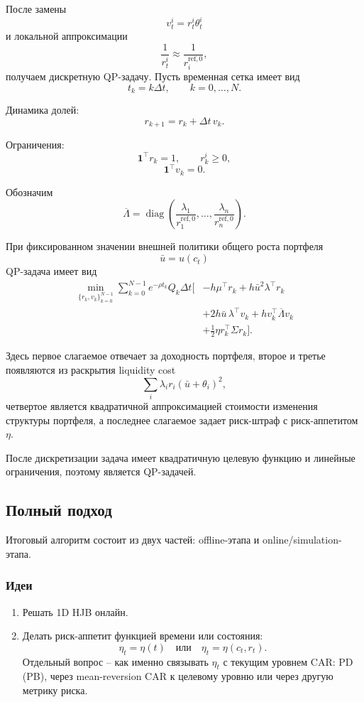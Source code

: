 \documentclass[12pt,a4paper]{article}
\begin{document}
После замены
\[
    v_t^i = r_t^i\theta_t^i
\]
и локальной аппроксимации
\[
    \frac{1}{r_t^i} \approx \frac{1}{r_i^{\mathrm{ref},0}},
\]
получаем дискретную QP-задачу. Пусть временная сетка имеет вид
\[
    t_k = k\Delta t,\qquad k=0,\dots,N.
\]

Динамика долей:
\[
    r_{k+1} = r_k + \Delta t\, v_k.
\]

Ограничения:
\[
    \mathbf{1}^\top r_k = 1,
    \qquad
    r_k^i \ge 0,
\]
\[
    \mathbf{1}^\top v_k = 0.
\]

Обозначим
\[
    \overline{\Lambda}
    =
    \operatorname{diag}
    \left(
        \frac{\lambda_1}{r_1^{\mathrm{ref},0}},
        \dots,
        \frac{\lambda_n}{r_n^{\mathrm{ref},0}}
    \right).
\]

При фиксированном значении внешней политики общего роста портфеля
\[
    \bar u = u(c_t)
\]
QP-задача имеет вид
\[
\begin{aligned}
    \min_{\{r_k,v_k\}_{k=0}^{N-1}}
    \sum_{k=0}^{N-1}
    e^{-\rho t_k}Q_k\Delta t
    \Big[
        &-h\mu^\top r_k
        + h\bar u^2\lambda^\top r_k \\
        &+ 2h\bar u\,\lambda^\top v_k
        + h v_k^\top\overline{\Lambda}v_k \\
        &+ \frac{1}{2}\eta r_k^\top\Sigma r_k
    \Big].
\end{aligned}
\]

Здесь первое слагаемое отвечает за доходность портфеля, второе и третье появляются из раскрытия liquidity cost
\[
    \sum_i \lambda_i r_i(\bar u+\theta_i)^2,
\]
четвертое является квадратичной аппроксимацией стоимости изменения структуры портфеля, а последнее слагаемое задает риск-штраф с риск-аппетитом $\eta$.

После дискретизации задача имеет квадратичную целевую функцию и линейные ограничения, поэтому является QP-задачей.

\subsection{Полный подход}

Итоговый алгоритм состоит из двух частей: offline-этапа и online/simulation-этапа.

\subsubsection*{Идеи}

\begin{enumerate}
    \item Решать 1D HJB онлайн.

    \item Делать риск-аппетит функцией времени или состояния:
    \[
        \eta_t = \eta(t)
        \quad \text{или} \quad
        \eta_t = \eta(c_t,r_t).
    \]
    Отдельный вопрос -- как именно связывать $\eta_t$ с текущим уровнем CAR: PD (PB), через mean-reversion CAR к целевому уровню или через другую метрику риска.
\end{enumerate}
\end{document}

